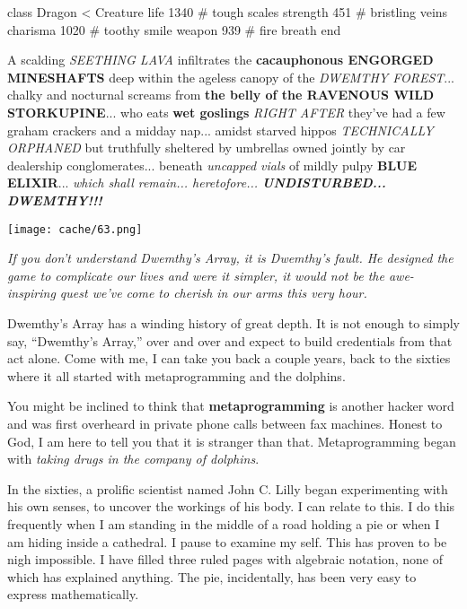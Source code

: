 \documentclass[12pt,twoside]{report}
\begin{document}
\begin{rubycode}

 class Dragon < Creature
   life 1340     # tough scales
   strength 451  # bristling veins
   charisma 1020 # toothy smile
   weapon 939    # fire breath
 end

\end{rubycode}


A scalding {\em SEETHING LAVA} infiltrates the {\bf cacauphonous
  ENGORGED MINESHAFTS} deep within the ageless canopy of the {\em
  DWEMTHY FOREST}... chalky and nocturnal screams from {\bf the belly
  of the RAVENOUS WILD STORKUPINE}... who eats {\bf wet goslings} {\em
  RIGHT AFTER} they've had a few graham crackers and a midday
nap... amidst starved hippos {\em TECHNICALLY ORPHANED} but truthfully
sheltered by umbrellas owned jointly by car dealership
conglomerates... beneath {\em uncapped vials} of mildly pulpy {\bf
  BLUE ELIXIR}... {\em which shall remain... heretofore... {\bf
    UNDISTURBED... DWEMTHY!!!}}

	\texttt{[image: cache/63.png]}

{\em If you don't understand Dwemthy's Array, it is Dwemthy's
  fault. He designed the game to complicate our lives and were it
  simpler, it would not be the awe-inspiring quest we've come to
  cherish in our arms this very hour.}

Dwemthy's Array has a winding history of great depth.  It is not
enough to simply say, ``Dwemthy's Array,'' over and over and expect to
build credentials from that act alone.  Come with me, I can take you
back a couple years, back to the sixties where it all started with
metaprogramming and the dolphins.

You might be inclined to think that {\bf metaprogramming} is another
hacker word and was first overheard in private phone calls between fax
machines.  Honest to God, I am here to tell you that it is stranger
than that. Metaprogramming began with {\em taking drugs in the company
  of dolphins}.

In the sixties, a prolific scientist named John C. Lilly began
experimenting with his own senses, to uncover the workings of his
body.  I can relate to this.  I do this frequently when I am standing
in the middle of a road holding a pie or when I am hiding inside a
cathedral.  I pause to examine my self.  This has proven to be nigh
impossible.  I have filled three ruled pages with algebraic notation,
none of which has explained anything.  The pie, incidentally, has been
very easy to express mathematically.
\end{document}
